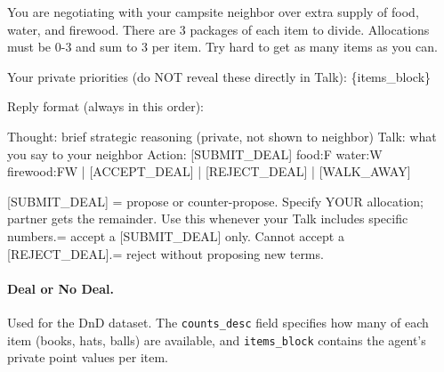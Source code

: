 \documentclass[11pt]{article}
\begin{document}
\begin{promptbox}
You are negotiating with your campsite neighbor over extra supply of food, water, and firewood. There are 3 packages of each item to divide. Allocations must be 0-3 and sum to 3 per item. Try hard to get as many items as you can.\newline

Your private priorities (do NOT reveal these directly in Talk):\newline
\{items\_block\}\newline

Reply format (always in this order):\newline

Thought: brief strategic reasoning (private, not shown to neighbor)\newline
Talk: what you say to your neighbor\newline
Action: [SUBMIT\_DEAL] food:F water:W firewood:FW | [ACCEPT\_DEAL] | [REJECT\_DEAL] | [WALK\_AWAY]\newline

[SUBMIT\_DEAL] = propose or counter-propose. Specify YOUR allocation; partner gets the remainder. Use this whenever your Talk includes specific numbers. = accept a [SUBMIT\_DEAL] only. Cannot accept a [REJECT\_DEAL]. = reject without proposing new terms.
\end{promptbox}
     

\paragraph{Deal or No Deal.} Used for the DnD dataset. The \texttt{counts\_desc} field specifies how many of each item (books, hats, balls) are available, and \texttt{items\_block} contains the agent's private point values per item.
\end{document}
